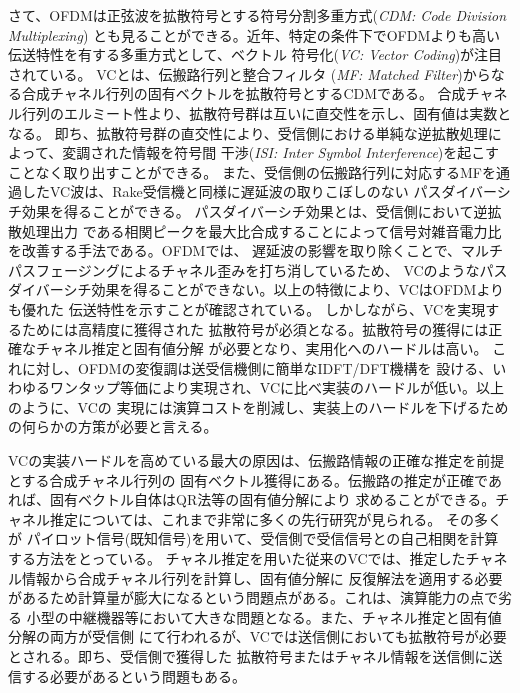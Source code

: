 さて、OFDMは正弦波を拡散符号とする符号分割多重方式(\emph{CDM: Code Division Multiplexing})
とも見ることができる。近年、特定の条件下でOFDMよりも高い伝送特性を有する多重方式として、ベクトル
符号化(\emph{VC: Vector Coding})が注目されている。\cite{kasturia} VCとは、伝搬路行列と整合フィルタ
(\emph{MF: Matched Filter})からなる合成チャネル行列の固有ベクトルを拡散符号とするCDMである。
合成チャネル行列のエルミート性より、拡散符号群は互いに直交性を示し、固有値は実数となる。
即ち、拡散符号群の直交性により、受信側における単純な逆拡散処理によって、変調された情報を符号間
干渉(\emph{ISI: Inter Symbol Interference})を起こすことなく取り出すことができる。
また、受信側の伝搬路行列に対応するMFを通過したVC波は、Rake受信機と同様に遅延波の取りこぼしのない
パスダイバーシチ効果を得ることができる。\cite{furukawa} パスダイバーシチ効果とは、受信側において逆拡散処理出力
である相関ピークを最大比合成することによって信号対雑音電力比を改善する手法である。OFDMでは、
遅延波の影響を取り除くことで、マルチパスフェージングによるチャネル歪みを打ち消しているため、
VCのようなパスダイバーシチ効果を得ることができない。以上の特徴により、VCはOFDMよりも優れた
伝送特性を示すことが確認されている。\cite{furukawa,li,takeda,takanashi} しかしながら、VCを実現するためには高精度に獲得された
拡散符号が必須となる。拡散符号の獲得には正確なチャネル推定と固有値分解
が必要となり、実用化へのハードルは高い。\cite{takano} \cite{takeda2} これに対し、OFDMの変復調は送受信機側に簡単なIDFT/DFT機構を
設ける、いわゆるワンタップ等価により実現され、VCに比べ実装のハードルが低い。以上のように、VCの
実現には演算コストを削減し、実装上のハードルを下げるための何らかの方策が必要と言える。

VCの実装ハードルを高めている最大の原因は、伝搬路情報の正確な推定を前提とする合成チャネル行列の
固有ベクトル獲得にある。伝搬路の推定が正確であれば、固有ベクトル自体はQR法等の固有値分解により
求めることができる。チャネル推定については、これまで非常に多くの先行研究が見られる。\cite{nagate} 
\cite{imamura} その多くが
パイロット信号(既知信号)を用いて、受信側で受信信号との自己相関を計算する方法をとっている。
チャネル推定を用いた従来のVCでは、推定したチャネル情報から合成チャネル行列を計算し、固有値分解に
反復解法を適用する必要があるため計算量が膨大になるという問題点がある。これは、演算能力の点で劣る
小型の中継機器等において大きな問題となる。また、チャネル推定と固有値分解の両方が受信側
にて行われるが、VCでは送信側においても拡散符号が必要とされる。即ち、受信側で獲得した
拡散符号またはチャネル情報を送信側に送信する必要があるという問題もある。

